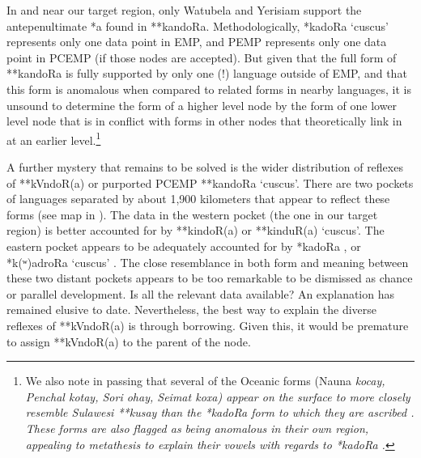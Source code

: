 In and near our target region,
only Watubela and Yerisiam support the antepenultimate *a found in **kandoRa.
Methodologically,  *kadoRa ‘cuscus’ represents only
one data point in EMP,
and PEMP represents only one data point in PCEMP (if those nodes are accepted).
But given that the full form of **kandoRa is fully supported
by only one (!) language outside of EMP,
and that this form is anomalous when compared to related forms
in nearby languages, it is unsound to determine the form of a higher level node by
the form of one lower level node that is in conflict with forms
in other nodes that theoretically link in at an earlier level.\footnote{
		We also note in passing that several of the Oceanic forms (Nauna
		\it{kocay}, Penchal \it{kotay}, Sori \it{ohay},
		Seimat \it{koxa}) appear on the surface to more closely resemble
		Sulawesi **kusay than the  *kadoRa form to which they
		are ascribed \citep{BlustTrussel2020}.
		These forms are also flagged as being anomalous in their own
		region, appealing to metathesis to explain their vowels with regards
		to  *kadoRa \citep[241]{Blust1982}.}

A further mystery that remains to be solved is the wider distribution
of reflexes of **kVndoR(a) or purported PCEMP **kandoRa ‘cuscus’.
There are two pockets of languages separated by about 1,900 kilometers
that appear to reflect these forms (see map in \citealp[62]{Schapper2011}).
The data in the western pocket (the one in our target region)
is better accounted for by **kindoR(a) or **kinduR(a) ‘cuscus’.
The eastern pocket appears to be adequately accounted for by
 *kadoRa \citep[241]{Blust1982},
or  *k(ʷ)adroRa ‘cuscus’ \citep[225]{OsmondPawley2011}.
The close resemblance in both form
and meaning between these two distant pockets appears to be too
remarkable to be dismissed as chance or parallel development.
Is all the relevant data available? An explanation has remained elusive to date.
Nevertheless, the best way to explain the diverse reflexes of
**kVndoR(a) is through borrowing.
Given this, it would be premature to assign **kVndoR(a) to the
parent of the  node.